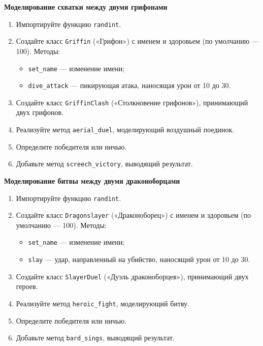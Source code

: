 \item \textbf{Моделирование схватки между двумя грифонами}

\begin{enumerate}
    \item Импортируйте функцию \texttt{randint}.

    \item Создайте класс \texttt{Griffin} («Грифон») с именем и здоровьем (по умолчанию — 100).  
    Методы:
    \begin{itemize}
        \item \texttt{set\_name} — изменение имени;
        \item \texttt{dive\_attack} — пикирующая атака, наносящая урон от 10 до 30.
    \end{itemize}

    \item Создайте класс \texttt{GriffinClash} («Столкновение грифонов»), принимающий двух грифонов.

    \item Реализуйте метод \texttt{aerial\_duel}, моделирующий воздушный поединок.

    \item Определите победителя или ничью.

    \item Добавьте метод \texttt{screech\_victory}, выводящий результат.
\end{enumerate}

\item \textbf{Моделирование битвы между двумя драконоборцами}

\begin{enumerate}
    \item Импортируйте функцию \texttt{randint}.

    \item Создайте класс \texttt{Dragonslayer} («Драконоборец») с именем и здоровьем (по умолчанию — 100).  
    Методы:
    \begin{itemize}
        \item \texttt{set\_name} — изменение имени;
        \item \texttt{slay} — удар, направленный на убийство, наносящий урон от 10 до 30.
    \end{itemize}

    \item Создайте класс \texttt{SlayerDuel} («Дуэль драконоборцев»), принимающий двух героев.

    \item Реализуйте метод \texttt{heroic\_fight}, моделирующий битву.

    \item Определите победителя или ничью.

    \item Добавьте метод \texttt{bard\_sings}, выводящий результат.
\end{enumerate}

